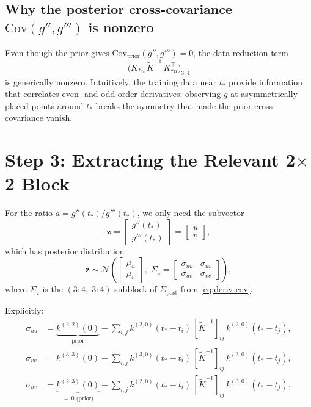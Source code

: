 \documentclass[11pt]{article}
\begin{document}
\subsection{Why the posterior cross-covariance $\mathrm{Cov}(g'', g''')$ is nonzero}

Even though the prior gives $\mathrm{Cov}_{\mathrm{prior}}(g'', g''') = 0$, the data-reduction term
\[
\bigl(K_{*n}\, \tilde{K}^{-1}\, K_{*n}^\top\bigr)_{3,4}
\]
is generically nonzero. Intuitively, the training data near $t_*$ provide information that correlates even- and odd-order derivatives: observing $g$ at asymmetrically placed points around $t_*$ breaks the symmetry that made the prior cross-covariance vanish.

\section{Step 3: Extracting the Relevant 2$\times$2 Block}

For the ratio $a = g''(t_*) / g'''(t_*)$, we only need the subvector
\[
\mathbf{z} = \begin{bmatrix} g''(t_*) \\ g'''(t_*) \end{bmatrix} = \begin{bmatrix} u \\ v \end{bmatrix},
\]
which has posterior distribution
\[
\mathbf{z} \sim \mathcal{N}\!\left(
\begin{bmatrix} \mu_u \\ \mu_v \end{bmatrix},\;
\Sigma_z = \begin{bmatrix} \sigma_{uu} & \sigma_{uv} \\ \sigma_{uv} & \sigma_{vv} \end{bmatrix}
\right),
\]
where $\Sigma_z$ is the $(3{:}4,\; 3{:}4)$ subblock of $\Sigma_{\mathrm{post}}$ from \eqref{eq:deriv-cov}.

Explicitly:
\begin{align}
\sigma_{uu} &= \underbrace{k^{(2,2)}(0)}_{\text{prior}} - \sum_{i,j} k^{(2,0)}(t_*-t_i)\,[\tilde K^{-1}]_{ij}\, k^{(2,0)}(t_*-t_j), \label{eq:sigma-uu}\\[6pt]
\sigma_{vv} &= k^{(3,3)}(0) - \sum_{i,j} k^{(3,0)}(t_*-t_i)\,[\tilde K^{-1}]_{ij}\, k^{(3,0)}(t_*-t_j), \label{eq:sigma-vv}\\[6pt]
\sigma_{uv} &= \underbrace{k^{(2,3)}(0)}_{=\,0\text{ (prior)}} - \sum_{i,j} k^{(2,0)}(t_*-t_i)\,[\tilde K^{-1}]_{ij}\, k^{(3,0)}(t_*-t_j). \label{eq:sigma-uv}
\end{align}
\end{document}
